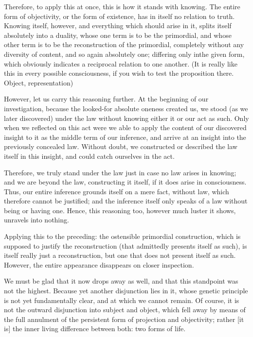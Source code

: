 Therefore, to apply this at once,
this is how it stands with knowing.
The entire form of objectivity,
or the form of existence,
has in itself no relation to truth.
Knowing itself, however,
and everything which should arise in it,
splits itself absolutely into a duality,
whose one term is to be the primordial,
and whose other term is to be
the reconstruction of the primordial,
completely without any diversity of content,
and so again absolutely one;
differing only inthe given form,
which obviously indicates
a reciprocal relation to one another.
(It is really like this in every possible consciousness,
if you wish to test the proposition there.
Object, representation)

However, let us carry this reasoning further.
At the beginning of our investigation,
because the looked-for absolute oneness created us,
we stood (as we later discovered) under the law
without knowing either it or our act as such.
Only when we reflected on this act were
we able to apply the content of our discovered insight
to it as the middle term of our inference,
and arrive at an insight into the previously concealed law.
Without doubt, we constructed or described
the law itself in this insight,
and could catch ourselves in the act.

Therefore, we truly stand under the law
just in case no law arises in knowing;
and we are beyond the law,
constructing it itself,
if it does arise in consciousness.
Thus, our entire inference grounds itself on a mere fact,
without law, which therefore cannot be justified;
and the inference itself only speaks of a law
without being or having one.
Hence, this reasoning too, however much luster it shows,
unravels into nothing.

Applying this to the preceding:
the ostensible primordial construction,
which is supposed to justify the reconstruction
(that admittedly presents itself as such),
is itself really just a reconstruction,
but one that does not present itself as such.
However, the entire appearance disappears on closer inspection.

We must be glad that it now drops away as well,
and that this standpoint was not the highest.
Because yet another disjunction lies in it,
whose genetic principle is not yet fundamentally clear,
and at which we cannot remain.
Of course, it is not the outward
disjunction into subject and object,
which fell away by means of the full annulment
of the persistent form of projection and objectivity;
rather [it is] the inner living difference between both:
two forms of life.

